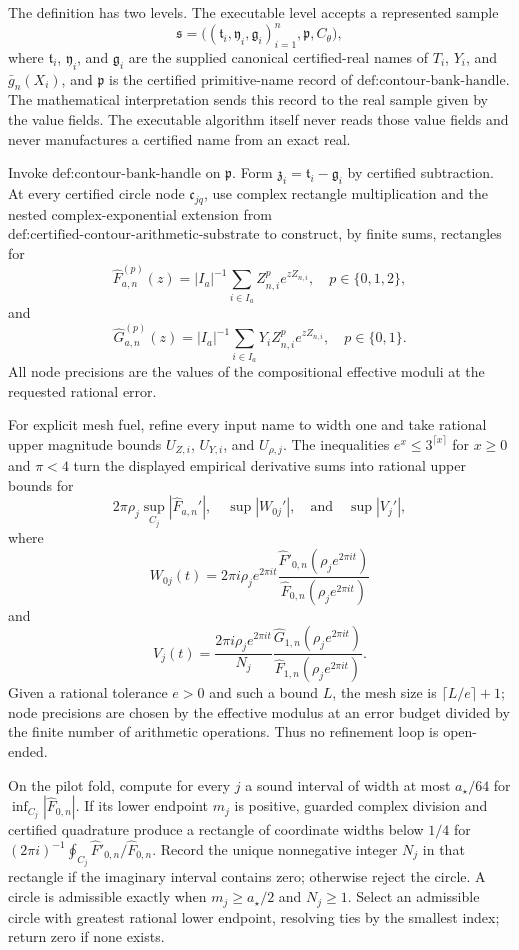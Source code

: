 The definition has two levels.  The executable level accepts a represented sample
\[
 \mathfrak s=
 \bigl((\mathfrak t_i,\mathfrak y_i,\mathfrak g_i)_{i=1}^n,
       \mathfrak p,C_{\theta}\bigr),
\]
where \(\mathfrak t_i\), \(\mathfrak y_i\), and \(\mathfrak g_i\) are the supplied canonical certified-real names of \(T_i\), \(Y_i\), and \(\bar g_n(X_i)\), and \(\mathfrak p\) is the certified primitive-name record of \(\text{def:contour-bank-handle}\).  The mathematical interpretation sends this record to the real sample given by the value fields.  The executable algorithm itself never reads those value fields and never manufactures a certified name from an exact real.

Invoke \(\text{def:contour-bank-handle}\) on \(\mathfrak p\).  Form \(\mathfrak z_i=\mathfrak t_i-\mathfrak g_i\) by certified subtraction.  At every certified circle node \(\mathfrak c_{jq}\), use complex rectangle multiplication and the nested complex-exponential extension from \(\text{def:certified-contour-arithmetic-substrate}\) to construct, by finite sums, rectangles for
\[
 \widehat F_{a,n}^{(p)}(z)
 =|I_a|^{-1}\sum_{i\in I_a}Z_{n,i}^{p}e^{zZ_{n,i}},
 \quad p\in\{0,1,2\},
\]
and
\[
 \widehat G_{a,n}^{(p)}(z)
 =|I_a|^{-1}\sum_{i\in I_a}Y_iZ_{n,i}^{p}e^{zZ_{n,i}},
 \quad p\in\{0,1\}.
\]
All node precisions are the values of the compositional effective moduli at the requested rational error.

For explicit mesh fuel, refine every input name to width one and take rational upper magnitude bounds \(U_{Z,i}\), \(U_{Y,i}\), and \(U_{\rho,j}\).  The inequalities \(e^x\le3^{\lceil x\rceil}\) for \(x\ge0\) and \(\pi<4\) turn the displayed empirical derivative sums into rational upper bounds for
\[
 2\pi\rho_j\sup_{C_j}|\widehat F_{a,n}'|,
 \quad
 \sup|W_{0j}'|,
 \quad\text{and}\quad
 \sup|V_j'|,
\]
where
\[
 W_{0j}(t)=2\pi i\rho_je^{2\pi it}
 \frac{\widehat F'_{0,n}(\rho_je^{2\pi it})}
      {\widehat F_{0,n}(\rho_je^{2\pi it})}
\]
and
\[
 V_j(t)=\frac{2\pi i\rho_je^{2\pi it}}{N_j}
 \frac{\widehat G_{1,n}(\rho_je^{2\pi it})}
      {\widehat F_{1,n}(\rho_je^{2\pi it})}.
\]
Given a rational tolerance \(e>0\) and such a bound \(L\), the mesh size is \(\lceil L/e\rceil+1\); node precisions are chosen by the effective modulus at an error budget divided by the finite number of arithmetic operations.  Thus no refinement loop is open-ended.

On the pilot fold, compute for every \(j\) a sound interval of width at most \(a_{\star}/64\) for \(\inf_{C_j}|\widehat F_{0,n}|\).  If its lower endpoint \(m_j\) is positive, guarded complex division and certified quadrature produce a rectangle of coordinate widths below \(1/4\) for \((2\pi i)^{-1}\oint_{C_j}\widehat F'_{0,n}/\widehat F_{0,n}\).  Record the unique nonnegative integer \(N_j\) in that rectangle if the imaginary interval contains zero; otherwise reject the circle.  A circle is admissible exactly when \(m_j\ge a_{\star}/2\) and \(N_j\ge1\).  Select an admissible circle with greatest rational lower endpoint, resolving ties by the smallest index; return zero if none exists.

